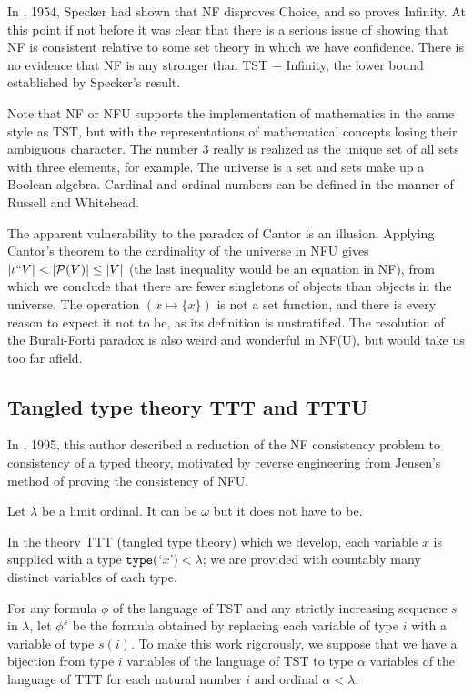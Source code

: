 \documentclass[112pt]{article}
\begin{document}
In \cite{notac}, 1954, Specker had shown that NF disproves Choice, and so proves Infinity.  At this point if not before it was clear that there is a serious issue of showing that NF is consistent relative to some set theory in which we have confidence.  There is no evidence that NF is any stronger than TST + Infinity, the lower bound established by Specker's result.

Note that NF or NFU supports the implementation of mathematics in the same style as TST, but with the representations of mathematical concepts losing their ambiguous character.  The number 3 really is realized as the unique set of all sets with three elements, for example.  The universe is a set and sets make up a Boolean algebra.   Cardinal and ordinal numbers can be defined
in the manner of Russell and Whitehead.

The apparent vulnerability to the paradox of Cantor is an illusion.  Applying Cantor's theorem to the cardinality of the universe in NFU gives $|\iota``V| < |{\cal P}(V)| \leq |V|$ (the last inequality would be an equation in NF), from which we conclude that there are fewer singletons of objects than objects in the universe.  The operation $(x \mapsto \{x\})$ is not a set function, and there is every reason to expect it not to be, as its definition is unstratified.  The resolution of the Burali-Forti paradox is also weird and wonderful in NF(U), but would take us too far afield.

\newpage

\subsection{Tangled type theory TTT and TTTU}

In \cite{tangled}, 1995, this author described a reduction of the NF consistency problem to consistency of a typed theory,  motivated by reverse engineering from Jensen's method of proving the consistency of NFU.

Let $\lambda$ be a limit ordinal.  It can be $\omega$ but it does not have to be.  

In the theory TTT (tangled type theory) which we develop, each variable $x$ is supplied with a type ${\tt type}($`$x$'$) <\lambda$;  we are provided with countably many distinct variables of each type.

For any formula $\phi$ of the language of TST and any strictly increasing sequence $s$ in $\lambda$, let $\phi^s$ be the formula obtained by replacing each variable
of type $i$ with a variable of type $s(i)$.  To make this work rigorously, we suppose that we have a bijection from type $i$ variables of the language of TST to type $\alpha$ variables
of the language of TTT for each natural number $i$ and ordinal $\alpha<\lambda$.
\end{document}
